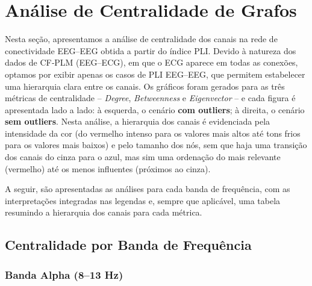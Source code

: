 \chapter{Análise de Centralidade de Grafos}
Nesta seção, apresentamos a análise de centralidade dos canais na rede de conectividade EEG–EEG obtida a partir do índice PLI. Devido à natureza dos dados de CF‐PLM (EEG–ECG), em que o ECG aparece em todas as conexões, optamos por exibir apenas os casos de PLI EEG–EEG, que permitem estabelecer uma hierarquia clara entre os canais. Os gráficos foram gerados para as três métricas de centralidade – \textit{Degree}, \textit{Betweenness} e \textit{Eigenvector} – e cada figura é apresentada lado a lado: à esquerda, o cenário \textbf{com outliers}; à direita, o cenário \textbf{sem outliers}. Nesta análise, a hierarquia dos canais é evidenciada pela intensidade da cor (do vermelho intenso para os valores mais altos até tons frios para os valores mais baixos) e pelo tamanho dos nós, sem que haja uma transição dos canais do cinza para o azul, mas sim uma ordenação do mais relevante (vermelho) até os menos influentes (próximos ao cinza).

A seguir, são apresentadas as análises para cada banda de frequência, com as interpretações integradas nas legendas e, sempre que aplicável, uma tabela resumindo a hierarquia dos canais para cada métrica.

\section{Centralidade por Banda de Frequência}
\subsection{Banda Alpha (8--13 Hz)}
